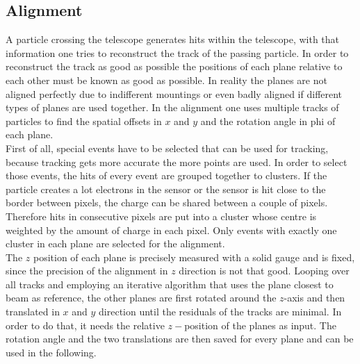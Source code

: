 \documentclass[british,11pt,a4paper]{memoir}
\begin{document}
\subsection{Alignment}
A particle crossing the telescope generates hits within the telescope, with that information one tries to reconstruct the track of the passing particle. In order to reconstruct the track as good as possible the positions of each plane relative to each other must be known as good as possible. In reality the planes are not aligned perfectly due to indifferent mountings or even badly aligned if different types of planes are used together. In the alignment one uses multiple tracks of particles to find the spatial offsets in $x$ and $y$ and the rotation angle in phi of each plane.\\
First of all, special events have to be selected that can be used for tracking, because tracking gets more accurate the more points are used. In order to select those events, the hits of every event are grouped together to clusters. If the particle creates a lot electrons in the sensor or the sensor is hit close to the border between pixels, the charge can be shared between a couple of pixels. Therefore hits in consecutive pixels are put into a cluster whose centre is weighted by the amount of charge in each pixel. Only events with exactly one cluster in each plane are selected for the alignment.\\
The $z$ position of each plane is precisely measured with a solid gauge and is fixed, since the precision of the alignment in $z$ direction is not that good. Looping over all tracks and employing an iterative algorithm that uses the plane closest to beam as reference, the other planes are first rotated around the $z$-axis and then translated in $x$ and $y$ direction until the residuals of the tracks are minimal. In order to do that, it needs the relative $z-$position of the planes as input. The rotation angle and the two translations are then saved for every plane and can be used in the following. 
\end{document}
